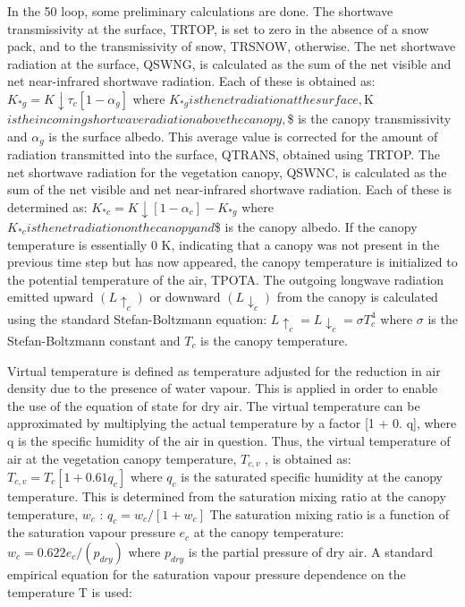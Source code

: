 In the 50 loop, some preliminary calculations are done. The shortwave transmissivity at the surface, T\+R\+T\+O\+P, is set to zero in the absence of a snow pack, and to the transmissivity of snow, T\+R\+S\+N\+O\+W, otherwise. The net shortwave radiation at the surface, Q\+S\+W\+N\+G, is calculated as the sum of the net visible and net near-\/infrared shortwave radiation. Each of these is obtained as\+: $K_{*g} = K \downarrow \tau_c [1 - \alpha_g ]$ where $K_{*g} is the net radiation at the surface, $K  $ is the incoming shortwave radiation above the canopy, $\$ is the canopy transmissivity and $\alpha_g$ is the surface albedo. This average value is corrected for the amount of radiation transmitted into the surface, Q\+T\+R\+A\+N\+S, obtained using T\+R\+T\+O\+P. The net shortwave radiation for the vegetation canopy, Q\+S\+W\+N\+C, is calculated as the sum of the net visible and net near-\/infrared shortwave radiation. Each of these is determined as\+: $K_{*c} = K \downarrow [1 - \alpha_c ] - K_{*g}$ where $K_{*c} is the net radiation on the canopy and $\$ is the canopy albedo. If the canopy temperature is essentially 0 K, indicating that a canopy was not present in the previous time step but has now appeared, the canopy temperature is initialized to the potential temperature of the air, T\+P\+O\+T\+A. The outgoing longwave radiation emitted upward $(L \uparrow_c )$ or downward $(L \downarrow_c )$ from the canopy is calculated using the standard Stefan-\/\+Boltzmann equation\+: $L \uparrow_c = L \downarrow_c = \sigma T_c^4$ where $\sigma$ is the Stefan-\/\+Boltzmann constant and $T_c$ is the canopy temperature.

Virtual temperature is defined as temperature adjusted for the reduction in air density due to the presence of water vapour. This is applied in order to enable the use of the equation of state for dry air. The virtual temperature can be approximated by multiplying the actual temperature by a factor \mbox{[}1 + 0. q\mbox{]}, where q is the specific humidity of the air in question. Thus, the virtual temperature of air at the vegetation canopy temperature, $T_{c,v}$ , is obtained as\+: $T_{c,v} = T_c [1 + 0.61 q_c ]$ where $q_c$ is the saturated specific humidity at the canopy temperature. This is determined from the saturation mixing ratio at the canopy temperature, $w_c$ \+: $q_c = w_c /[1 + w_c ]$ The saturation mixing ratio is a function of the saturation vapour pressure $e_c$ at the canopy temperature\+: $w_c = 0.622 e_c /(p_{dry} )$ where $p_{dry}$ is the partial pressure of dry air. A standard empirical equation for the saturation vapour pressure dependence on the temperature T is used\+:

